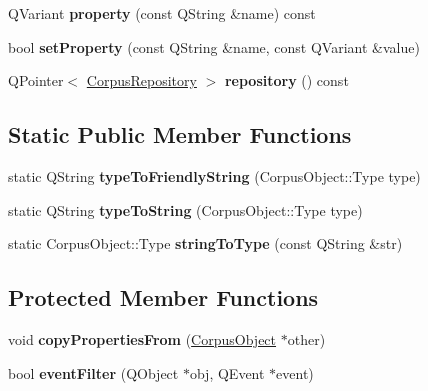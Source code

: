 \begin{DoxyCompactItemize}
\mbox{\label{class_corpus_object_a373445edd8e454dbd4afe8e861f68243}} 
Q\+Variant {\bfseries property} (const Q\+String \&name) const
\item 
\mbox{\label{class_corpus_object_a60216fe28daeecc9cb2fc30d38db3625}} 
bool {\bfseries set\+Property} (const Q\+String \&name, const Q\+Variant \&value)
\item 
\mbox{\label{class_corpus_object_acf7d6ac282eb3a522ae37f8ee890fcef}} 
Q\+Pointer$<$ \hyperlink{class_corpus_repository}{Corpus\+Repository} $>$ {\bfseries repository} () const
\end{DoxyCompactItemize}
\subsection*{Static Public Member Functions}
\begin{DoxyCompactItemize}
\item 
\mbox{\label{class_corpus_object_ae234a9c51d4835904f4266e333c85dd8}} 
static Q\+String {\bfseries type\+To\+Friendly\+String} (Corpus\+Object\+::\+Type type)
\item 
\mbox{\label{class_corpus_object_ac7e99e31de551e3af537963caf4584c7}} 
static Q\+String {\bfseries type\+To\+String} (Corpus\+Object\+::\+Type type)
\item 
\mbox{\label{class_corpus_object_a25b56b17b6dcc2894c7590c3a43f9681}} 
static Corpus\+Object\+::\+Type {\bfseries string\+To\+Type} (const Q\+String \&str)
\end{DoxyCompactItemize}
\subsection*{Protected Member Functions}
\begin{DoxyCompactItemize}
\item 
\mbox{\label{class_corpus_object_a5e16a4a58de09340ba669bdea107b4d2}} 
void {\bfseries copy\+Properties\+From} (\hyperlink{class_corpus_object}{Corpus\+Object} $\ast$other)
\item 
\mbox{\label{class_corpus_object_af91aaf99f39a8fc41ffbe62238c90c4e}} 
bool {\bfseries event\+Filter} (Q\+Object $\ast$obj, Q\+Event $\ast$event)
\end{DoxyCompactItemize}

